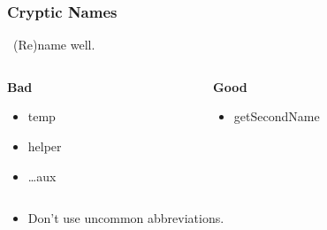 \begin{frame}

\frametitle{Cryptic Names}

\begin{center}

\leftthumbsup~(Re)name well.~\rightthumbsup

\end{center}

\begin{columns}

\begin{column}{0.5\textwidth}

\begin{center}

\textbf{Bad}

\end{center}

\begin{itemize}

\item temp

\item helper

\item \ldots aux

\end{itemize}

\end{column}

\begin{column}{0.5\textwidth}

\begin{center}

\textbf{Good}

\end{center}

\begin{itemize}

\item getSecondName

\end{itemize}

\end{column}

\end{columns}

\vspace{\fill}

\begin{itemize}

\item Don't use uncommon abbreviations.

\end{itemize}

\end{frame}
